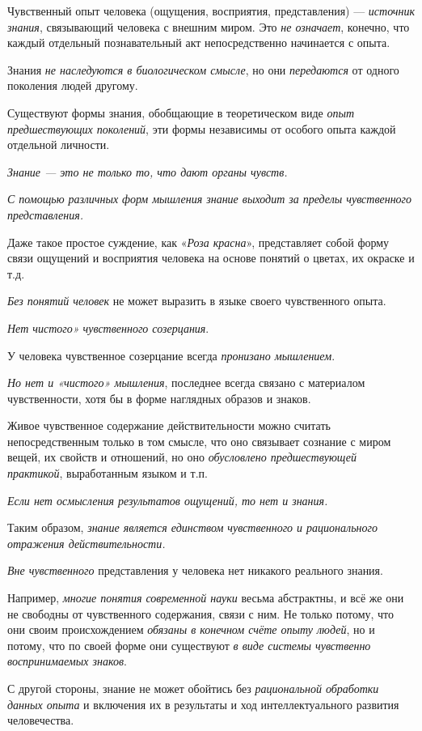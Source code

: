 \documentclass[a4paper,14pt,russian]{extreport}
\begin{document}
Чувственный опыт человека (ощущения, восприятия, представления) --- \emph{источник знания}, связывающий человека с внешним миром. Это \emph{не означает}, конечно, что каждый отдельный познавательный акт непосредственно начинается с опыта.

Знания \emph{не наследуются в биологическом смысле}, но они \emph{передаются} от одного поколения людей другому.

Существуют формы знания, обобщающие в теоретическом виде \emph{опыт предшествующих поколений}, эти формы независимы от особого опыта каждой отдельной личности.

\emph{Знание --- это не только то, что дают органы чувств.}

\emph{С помощью различных форм мышления знание выходит за пределы чувственного представления.}

Даже такое простое суждение, как «\emph{Роза красна}», представляет собой форму связи ощущений и восприятия человека на основе понятий о цветах, их окраске и т.д.

\emph{Без понятий человек} не может выразить в языке своего чувственного опыта.

\emph{Нет чистого» чувственного созерцания}.

У человека чувственное созерцание всегда \emph{пронизано мышлением}.

\emph{Но нет и «чистого» мышления}, последнее всегда связано с материалом чувственности, хотя бы в форме наглядных образов и знаков.

Живое чувственное содержание действительности можно считать непосредственным только в том смысле, что оно связывает сознание с миром вещей, их свойств и отношений, но оно \emph{обусловлено предшествующей практикой}, выработанным языком и т.п.

\emph{Если нет осмысления результатов ощущений, то нет и знания.}

Таким образом, \emph{знание является единством чувственного и рационального отражения действительности.}

\emph{Вне чувственного} представления у человека нет никакого реального знания.

Например, \emph{многие понятия современной науки} весьма абстрактны, и всё же они не свободны от чувственного содержания, связи с ним. Не только потому, что они своим происхождением \emph{обязаны в конечном счёте опыту людей}, но и потому, что по своей форме они существуют \emph{в виде системы чувственно воспринимаемых знаков}.

С другой стороны, знание не может обойтись без \emph{рациональной обработки данных опыта} и включения их в результаты и ход интеллектуального развития человечества.
\end{document}
